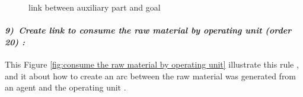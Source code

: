 \begin{figure}[th]
 
\caption{\label{fig:link between auxiliary part and goal}link between auxiliary part and goal}
 
\end{figure}

\vspace{1cm}
\paragraph{\emph{9)~Create link to consume the raw material by operating unit  (order 20) :} }
 
 
This Figure \ref{fig:consume the raw material by operating unit}  illustrate  this rule , and it about how to create an arc between 
the raw material was generated from an agent and the operating unit .

